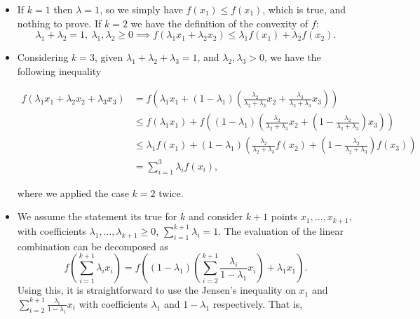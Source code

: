 \documentclass[12pt]{scrartcl}
\begin{document}
\begin{itemize}
    \item If $k=1$ then $\lambda = 1$, so we simply have $f(x_1) \leq f(x_1)$, which is true, and
    nothing to prove. If $k=2$ we have the definition of the convexity of $f$:
    \begin{equation*}
        \lambda_1 + \lambda_2 = 1, \ \lambda_1, \lambda_2 \geq 0 \implies f(\lambda_1 x_1 + \lambda_2 x_2) \leq \lambda_1 f(x_1) + \lambda_2 f(x_2).
    \end{equation*}
    
    \item Considering $k=3$, given $\lambda_1 + \lambda_2 + \lambda_3 = 1$, and $\lambda_2, \lambda_3 > 0$, we have the following inequality
    
    \begin{align*}
        f\left(\lambda_1 x_1 + \lambda_2 x_2 + \lambda_3 x_3\right) &= 
            f\left(\lambda_1 x_1 + (1 - \lambda_1) \left( \frac{\lambda_2}{\lambda_2 + \lambda_3} x_2 + \frac{\lambda_3}{\lambda_2 + \lambda_3} x_3\right) \right)\\
            &\leq f(\lambda_1 x_1) + f\left((1-\lambda_1) \left( \frac{\lambda_2}{\lambda_2 + \lambda_3} x_2  + \left(1 - \frac{\lambda_2}{\lambda_2 + \lambda_3}\right) x_3 \right) \right)\\
            &\leq \lambda_1 f(x_1) + (1-\lambda_1)\left(\frac{\lambda_2}{\lambda_2 + \lambda_3} f(x_2) + \left(1-\frac{\lambda_2}{\lambda_2 + \lambda_3}\right) f(x_3)\right) \\
            &= \sum_{i=1}^3 \lambda_i f(x_i),
    \end{align*}
    
    where we applied the case $k=2$ twice.
    
    \item We assume the statement its true for $k$ and consider $k+1$ points $x_1, \dots, x_{k+1}$, with coefficients $\lambda_1, \dots, \lambda_{k+1} \geq 0$, $\sum_{i=1}^{k+1} \lambda_i = 1$. The evaluation of the linear combination can be decomposed as
    \begin{equation*}
        f\left( \sum_{i=1}^{k+1} \lambda_i  x_i \right) = f\left( (1-\lambda_1) \left(\sum_{i=2}^{k+1} \frac{\lambda_i}{1-\lambda_1} x_i\right) + \lambda_1 x_1\right).
    \end{equation*}
    Using this, it is straightforward to use the Jensen's inequality on $x_1$ and $\sum_{i=2}^{k+1} \frac{\lambda_i}{1-\lambda_1} x_i $ with coefficients $\lambda_1$ and $1-\lambda_1$  respectively.  That is,


\end{itemize}
\end{document}
